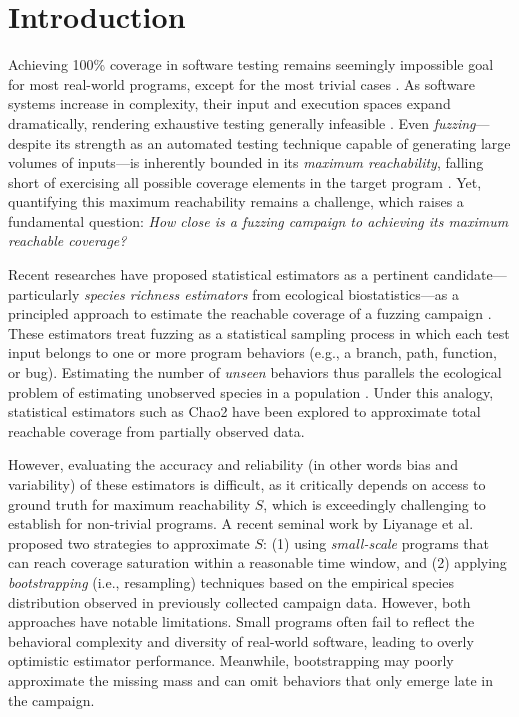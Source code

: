 \section{Introduction}

Achieving 100\% coverage in software testing remains seemingly impossible goal for most real-world programs, except for the most trivial cases \cite{horgan1994achieving}. As software systems increase in complexity, their input and execution spaces expand dramatically, rendering exhaustive testing generally infeasible \cite{knight1996exhaustive}. Even \emph{fuzzing}—despite its strength as an automated testing technique capable of generating large volumes of inputs—is inherently bounded in its \emph{maximum reachability}, falling short of exercising all possible coverage elements in the target program \cite{fell2017review}. Yet, quantifying this maximum reachability remains a challenge, which raises a fundamental question: \emph{How close is a fuzzing campaign to achieving its maximum reachable coverage?}

Recent researches have proposed statistical estimators as a pertinent candidate—particularly \emph{species richness estimators} from ecological biostatistics—as a principled approach to estimate the reachable coverage of a fuzzing campaign \cite{reachability_2023,stads}. These estimators treat fuzzing as a statistical sampling process in which each test input belongs to one or more program behaviors (e.g., a branch, path, function, or bug). Estimating the number of \emph{unseen} behaviors thus parallels the ecological problem of estimating unobserved species in a population \cite{chao2016species}. Under this analogy, statistical estimators such as Chao2 \cite{chao2017thirty} have been explored to approximate total reachable coverage from partially observed data.

However, evaluating the accuracy and reliability (in other words bias and variability) of these estimators is difficult, as it critically depends on access to ground truth for maximum reachability $S$, which is exceedingly challenging to establish for non-trivial programs. A recent seminal work by Liyanage et al.~\cite{reachability_2023} proposed two strategies to approximate $S$: (1) using \emph{small-scale} programs that can reach coverage saturation within a reasonable time window, and (2) applying \emph{bootstrapping} (i.e., resampling) techniques based on the empirical species distribution observed in previously collected campaign data. However, both approaches have notable limitations. Small programs often fail to reflect the behavioral complexity and diversity of real-world software, leading to overly optimistic estimator performance. Meanwhile, bootstrapping may poorly approximate the missing mass \cite{residual2021} and can omit behaviors that only emerge late in the campaign.

